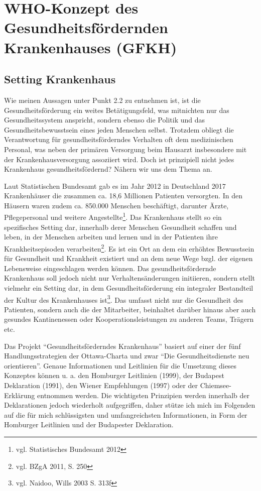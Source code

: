 \section{WHO-Konzept des Gesundheitsfördernden Krankenhauses (GFKH)}
\label{sec:WHOKonzeptDesGesundheitsförderndenKrankenhausesGFKH}

\subsection{Setting Krankenhaus}
\label{sec:SettingKrankenhaus}

Wie meinen Aussagen unter Punkt 2.2 zu entnehmen ist, ist die Gesundheitsförderung ein weites Betätigungsfeld, was mitnichten nur das Gesundheitssystem anspricht, sondern ebenso die Politik und das Gesundheitsbewusstsein eines jeden Menschen selbst. Trotzdem obliegt die Verantwortung für gesundheitsförderndes Verhalten oft dem medizinischen Personal, was neben der primären Versorgung beim Hausarzt insbesondere mit der  Krankenhausversorgung assoziiert wird. Doch ist prinzipiell nicht jedes Krankenhaus gesundheitsfördernd? Nähern wir uns dem Thema an.

Laut Statistischen Bundesamt gab es im Jahr 2012 in Deutschland 2017 Krankenhäuser die zusammen ca. 18,6 Millionen Patienten versorgten. In den Häusern waren zudem ca. 850.000 Menschen beschäftigt, darunter Ärzte, Pflegepersonal und weitere Angestellte\footnote{vgl. Statistisches Bundesamt 2012}. Das Krankenhaus stellt so ein spezifisches Setting dar, innerhalb derer Menschen Gesundheit schaffen und leben, in der Menschen arbeiten und lernen und in der Patienten ihre Krankheitsepisoden verarbeiten\footnote{vgl. BZgA 2011, S. 250}. Es ist ein Ort an dem ein erhöhtes Bewusstsein für Gesundheit und Krankheit existiert und an dem neue Wege bzgl. der eigenen Lebensweise eingeschlagen werden können. Das gesundheitsfördernde Krankenhaus soll jedoch nicht nur Verhaltensänderungen initiieren, sondern stellt vielmehr ein Setting dar, in dem Gesundheitsförderung ein integraler Bestandteil der Kultur des Krankenhauses ist\footnote{vgl. Naidoo, Wills 2003 S. 313f}. Das umfasst nicht nur die Gesundheit des Patienten, sondern auch die der Mitarbeiter, beinhaltet darüber hinaus aber auch gesundes Kantinenessen oder Kooperationsleistungen zu anderen Teams, Trägern etc.

Das Projekt "`Gesundheitsförderndes Krankenhaus"' basiert auf einer der fünf Handlungsstrategien der Ottawa-Charta und zwar "`Die Gesundheitsdienste neu orientieren"'. 
Genaue Informationen und Leitlinien für die Umsetzung dieses Konzeptes können u. a. den Homburger Leitlinien (1999), der Budapest Deklaration (1991), den Wiener Empfehlungen (1997) oder der Chiemsee-Erklärung entnommen werden. Die wichtigsten Prinzipien werden innerhalb der Deklarationen jedoch wiederholt aufgegriffen, daher stütze ich mich im Folgenden auf die für mich schlüssigsten und umfangreichsten Informationen, in Form der Homburger Leitlinien und der Budapester Deklaration. 

